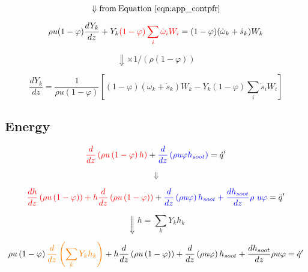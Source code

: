 \begin{equation*}
	\Downarrow \mathrm{from \: Equation~\eqref{eqn:app_contpfr}}
\end{equation*}

\begin{equation*}
	\rho u(1-\varphi)
	\frac{dY_k}{dz}
	+
	Y_k
	\color{red}
	(1-\varphi)\sum_{i}{{\dot{\omega}}_iW_i}
	\color{black}
	=
	(1-\varphi)({\dot{\omega}}_k+{\dot{s}}_k)W_k
\end{equation*}


\begin{equation*}
	\Downarrow \times 1/(\rho (1-\varphi))
\end{equation*}

\begin{equation}
	\frac{dY_k}{dz}=\frac{1}{\rho u(1-\varphi)}\left[(1-\varphi)({\dot{\omega}}_k+{\dot{s}}_k)W_k-Y_k(1-\varphi)\sum_{i}{{\dot{s}}_iW_i}\right]
	\label{eqn:app_speciespfr}
\end{equation}

\subsection{Energy}

\begin{equation*}
	\color{red}
	\frac{d}{dz}\left(\rho u\left(1-\varphi\right)h\right)
	\color{black}
	+
	\color{blue}
	\frac{d}{dz}\left(\rho u\varphi h_{soot}\right)
	\color{black}
	={\dot{q}}^\prime
\end{equation*}

\begin{equation*}
	\Downarrow
\end{equation*}


\begin{equation*}
	\color{red}
	\frac{dh}{dz}\left(\rho u\left(1-\varphi\right)\right)+h\frac{d}{dz}\left(\rho u\left(1-\varphi\right)\right)
	\color{black}
	+
	\color{blue}
	\frac{d}{dz}\left(\rho u\varphi\right)h_{soot}+\frac{dh_{soot}}{dz}\rho\ u\varphi
	\color{black}
	={\dot{q}}^\prime
\end{equation*}

\begin{equation*}
	\Downarrow h=\sum_{k}{Y_kh_k}
\end{equation*}

\begin{equation*}
	\rho u\left(1-\varphi\right)
	\color{orange}
	\frac{d}{dz}\left(
	\sum_{k}{Y_k h_k}\right)
	\color{black}
	+
	h
	\frac{d}{dz}\left(\rho u\left(1-\varphi\right)\right)
	+
	\frac{d}{dz}\left(\rho u\varphi\right)h_{soot}+\frac{dh_{soot}}{dz}\rho u\varphi={\dot{q}}^\prime
\end{equation*}

